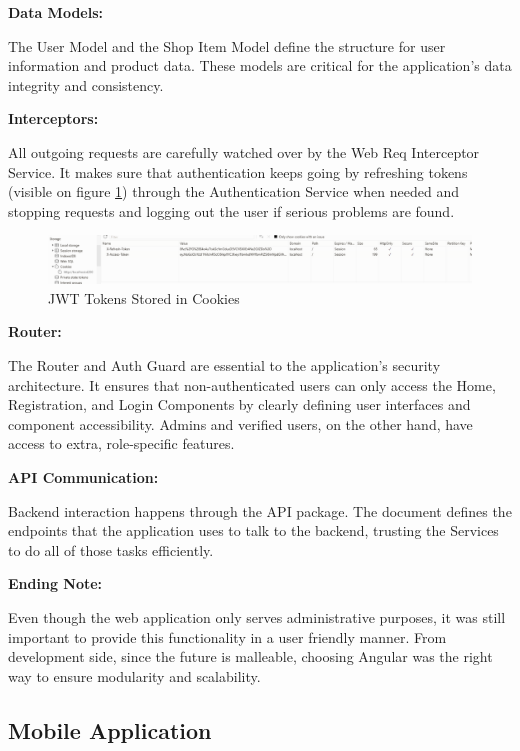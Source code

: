 \noindent\textbf{Data Models:} 

The User Model and the Shop Item Model define the structure for user information and product data. These models are critical for the application's data integrity and consistency.

\noindent\textbf{Interceptors:} 

All outgoing requests are carefully watched over by the Web Req Interceptor Service. It makes sure that authentication keeps going by refreshing tokens (visible on figure \ref{fig:cookies}) through the Authentication Service when needed and stopping requests and logging out the user if serious problems are found.

\begin{figure}[H]
	\centering
	\includegraphics[width=1\linewidth]{img/cookies_ss.png}
	\caption{JWT Tokens Stored in Cookies}
	\label{fig:cookies}
\end{figure}


\noindent\textbf{Router:} 

The Router and Auth Guard are essential to the application's security architecture. It ensures that non-authenticated users can only access the Home, Registration, and Login Components by clearly defining user interfaces and component accessibility. Admins and verified users, on the other hand, have access to extra, role-specific features.

\noindent\textbf{API Communication:}

Backend interaction happens through the API package. The document defines the endpoints that the application uses to talk to the backend, trusting the Services to do all of those tasks efficiently.

\noindent\textbf{Ending Note:}

Even though the web application only serves administrative purposes, it was still important to provide this functionality in a user friendly manner. From development side, since the future is malleable, choosing Angular was the right way to ensure modularity and scalability. 

\newpage

\subsection{Mobile Application}

